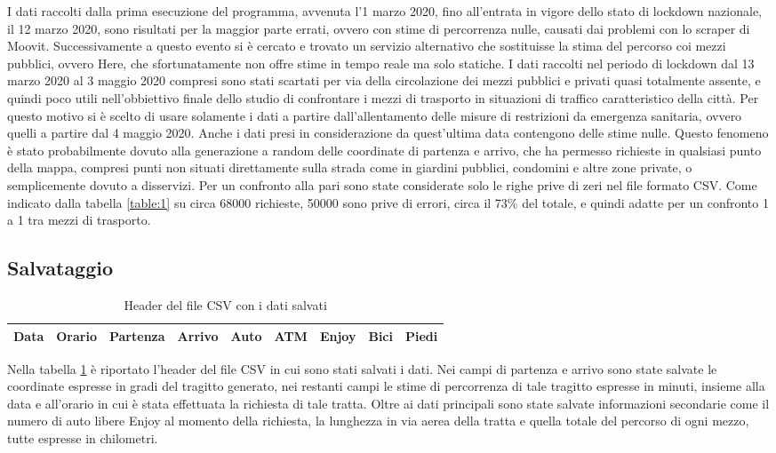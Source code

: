 I dati raccolti dalla prima esecuzione del programma, avvenuta l'1 marzo 2020, fino all'entrata in vigore dello stato di lockdown nazionale, il 12 marzo 2020, sono risultati per la maggior parte errati, ovvero con stime di percorrenza nulle, causati dai problemi con lo scraper di Moovit. Successivamente a questo evento si è cercato e trovato un servizio alternativo che sostituisse la stima del percorso coi mezzi pubblici, ovvero Here, che sfortunatamente non offre stime in tempo reale ma solo statiche. I dati raccolti nel periodo di lockdown dal 13 marzo 2020 al 3 maggio 2020 compresi sono stati scartati per via della circolazione dei mezzi pubblici e privati quasi totalmente assente, e quindi poco utili nell'obbiettivo finale dello studio di confrontare i mezzi di trasporto in situazioni di traffico caratteristico della città. Per questo motivo si è scelto di usare solamente i dati a partire dall'allentamento delle misure di restrizioni da emergenza sanitaria, ovvero quelli a partire dal 4 maggio 2020. Anche i dati presi in considerazione da quest'ultima data contengono delle stime nulle. Questo fenomeno è stato probabilmente dovuto alla generazione a random delle coordinate di partenza e arrivo, che ha permesso richieste in qualsiasi punto della mappa, compresi punti non situati direttamente sulla strada come in giardini pubblici, condomini e altre zone private, o semplicemente dovuto a disservizi. Per un confronto alla pari sono state considerate solo le righe prive di zeri nel file formato CSV. Come indicato dalla tabella \ref{table:1} su circa 68000 richieste, 50000 sono prive di errori, circa il 73\% del totale, e quindi adatte per un confronto 1 a 1 tra mezzi di trasporto.

\subsection{Salvataggio}

\begin{table}[H]
\centering
\begin{tabular}{ | c | c | c | c | c | c | c | c | c | }
\hline
Data & Orario & Partenza & Arrivo & Auto & ATM & Enjoy & Bici & Piedi \\
\hline
\end{tabular}
\caption{Header del file CSV con i dati salvati}
\label{table:7}
\end{table}

Nella tabella \ref{table:7} è riportato l'header del file CSV in cui sono stati salvati i dati. Nei campi di partenza e arrivo sono state salvate le coordinate espresse in gradi del tragitto generato, nei restanti campi le stime di percorrenza di tale tragitto espresse in minuti, insieme alla data e all'orario in cui è stata effettuata la richiesta di tale tratta. Oltre ai dati principali sono state salvate informazioni secondarie come il numero di auto libere Enjoy al momento della richiesta, la lunghezza in via aerea della tratta e quella totale del percorso di ogni mezzo, tutte espresse in chilometri.


